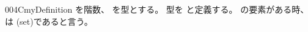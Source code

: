 \documentclass[index]{subfiles}
\begin{document}
\begin{myBlock}{004C}{myDefinition}
  を階数、
  を型とする。
  型を
  と定義する。
  の要素がある時、は
  (set)であると言う。
\end{myBlock}
\end{document}

